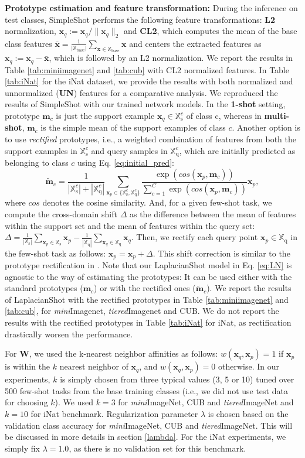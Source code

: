 \documentclass{article}
\newcommand{\xx}{\mathbf x}
\newcommand{\xxq}{\mathbf{x}}
\newcommand{\XXb}{\mathbb{X}_{\text{base}}}
\newcommand{\XXs}{\mathbb{X}_{\text{s}}}
\newcommand{\XXq}{\mathbb{X}_{\text{q}}}
\newcommand{\WW}{\mathbf W}
\newcommand{\mm}{{\mathbf m}}
\begin{document}
\textbf{Prototype estimation and feature transformation:}
During the inference on test classes, SimpleShot \cite{wang2019simpleshot} performs the following feature transformations: \textbf{L2} normalization, $\xxq_q:=\xxq_q/\|\xxq_q\|_2$ and \textbf{CL2}, which computes the mean of the base class features $\bar{\xx} = \frac{1}{|\XXb|}\sum_{\xx \in\XXb} \xx$ and centers the extracted features as $\xxq_q:= \xxq_q -\bar{\xx}$, which is followed by an L2 normalization. We report the results in Table \ref{tab:miniimagenet} and \ref{tab:cub} with CL2 normalized features. In Table \ref{tab:iNat} for the iNat dataset, we provide the results with both normalized and unnormalized (\textbf{UN}) features for a comparative analysis. We reproduced the results of SimpleShot with our trained network models. In the \textbf{1-shot} setting, prototype $\mm_c$ is just the support example $\xxq_q \in \XXs^c$ of class c, whereas in \textbf{multi-shot}, $\mm_c$ is the simple mean of the support examples of class $c$. Another option is to use \emph{rectified} prototypes, i.e., a weighted combination of features from both the support examples in $\XXs^c$ and query samples in $\XXq^c$, which are initially predicted as belonging to class $c$ using Eq. \eqref{eq:initial_pred}: 
\[\tilde{\mm}_c = \frac{1}{|\XXs^c|+|\XXq^c|}\sum_{\xxq_p \in \{\XXs^c,\XXq^c\}}  \frac{\exp(cos(\xxq_p,\mm_c))}{\sum_{c=1}^{C} \exp(cos(\xxq_p,\mm_c))}\xxq_p,\]
where $cos$ denotes the cosine similarity. And, for a given few-shot task, we compute the cross-domain shift $\Delta$ as the difference between the mean of features within the support set and the mean of features within the query set: $\Delta = \frac{1}{|\XXs|}\sum_{\xx_p \in\XXs} \xx_p - \frac{1}{|\XXq|}\sum_{\xx_q \in\XXq} \xx_q$. 
Then, we rectify each query point $\xxq_p \in \XXq$ in the few-shot task as follows: $\xxq_p = \xxq_p + \Delta$. This shift correction is similar to the prototype rectification in \cite{liu2019prototype}.
Note that our LaplacianShot model in Eq. \eqref{eq:LN} is agnostic to the way of estimating the prototypes: It can be used either with the standard prototypes ($\mm_c$) or with the rectified ones ($\tilde{\mm}_{c}$). 
We report the results of LaplacianShot with the rectified prototypes in Table \ref{tab:miniimagenet} and \ref{tab:cub}, for \textit{mini}Imagenet, \textit{tiered}Imagenet and CUB. We do not report the results with the rectified prototypes in Table \ref{tab:iNat} for iNat, as rectification drastically worsen the performance.

For $\WW$, we used the k-nearest neighbor affinities as follows: $w(\xxq_q,\xxq_p) =1$ if $\xxq_p$ is within the $k$ nearest neighbor of $\xxq_q$, and $w(\xxq_q,\xxq_p) =0$ otherwise. In our experiments, $k$ is simply chosen from three typical values (3, 5 or 10) tuned over 500 few-shot tasks from the base training classes (i.e., we did not use test data for choosing $k$). We used $k=3$ for \textit{mini}ImageNet, CUB and \textit{tiered}ImageNet and $k=10$ for iNat benchmark. Regularization parameter $\lambda$ is chosen based on the validation class accuracy for \textit{mini}ImageNet, CUB and \textit{tiered}ImageNet. This will be discussed in more details in section \ref{lambda}. For the iNat experiments, we simply fix $\lambda=1.0$, as there is no validation set for this benchmark.
\end{document}
